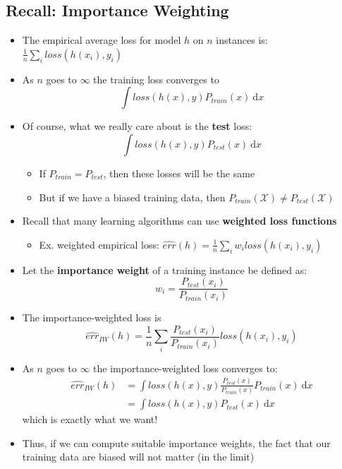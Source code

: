 \documentclass[10pt]{article}
\newcommand{\dd}{\text{d}}
\begin{document}
\subsection*{Recall: Importance Weighting}
\begin{itemize}
	\item The empirical average loss for model $h$ on $n$ instances is: $\frac{1}{n} \sum_i loss(h(x_i), y_i)$
	\item As $n$ goes to $\infty$ the training loss converges to
	\[\int loss(h(x), y) P_{train}(x) \:\dd x\]
    \item Of course, what we really care about is the \textbf{test} loss:
    \[\int loss(h(x), y) P_{test}(x) \:\dd x\]
    \begin{itemize}
	    \item If $P_{train} = P_{test}$, then these losses will be the same
	    \item But if we have a biased training data, then $P_{train}(\mathcal{X}) \neq P_{test}(\mathcal{X})$
    \end{itemize}
    \item Recall that many learning algorithms can use \textbf{weighted loss functions}
    \begin{itemize}
	    \item Ex. weighted empirical loss: $\widehat{err}(h) = \frac{1}{n} \sum_i w_i loss(h(x_i), y_i)$
    \end{itemize}
    \item Let the \textbf{importance weight} of a training instance be defined as:
    \[w_i = \frac{P_{test}(x_i)}{P_{train}(x_i)}\]
    \item The importance-weighted loss is
    \[\widehat{err}_{IW}(h) = \frac{1}{n} \sum_i \frac{P_{test}(x_i)}{P_{train}(x_i)} loss(h(x_i), y_i)\]
    \item As $n$ goes to $\infty$ the importance-weighted loss converges to:
    \begin{align*}
        \widehat{err}_{IW}(h) &= \int loss(h(x), y) \frac{P_{test}(x)}{P_{train}(x)} P_{train}(x) \:\dd x \\
        &= \int loss(h(x), y) P_{test}(x) \:\dd x
    \end{align*}
    which is exactly what we want!
    \item Thus, if we can compute suitable importance weights, the fact that our training data are biased will not matter (in the limit)
\end{itemize}
\end{document}
